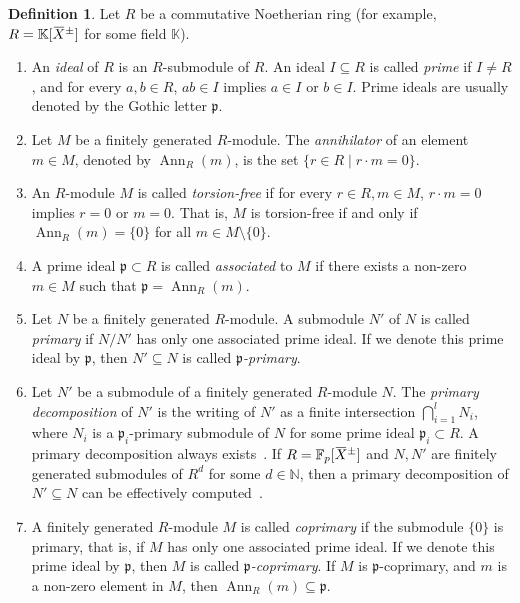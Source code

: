 \documentclass[a4paper,UKenglish,cleveref, autoref, thm-restate]{lipics-v2021}
\newcommand{\N}{\mathbb{N}}
\newcommand{\K}{\mathbb{K}}
\newcommand{\F}{\mathbb{F}}
\newcommand{\Ann}{\operatorname{Ann}}
\newcommand{\oX}{\mkern 1.5mu\overline{\mkern-1.5mu X \mkern-1.5mu}\mkern 1.5mu}
\newcommand{\frp}{\mathfrak{p}}
\theoremstyle{definition}
\newtheorem{defn}[thrm]{Definition}
\theoremstyle{definition}
\theoremstyle{definition}
\begin{document}
\begin{defn}\label{def:commalg}
    Let $R$ be a commutative Noetherian ring (for example, $R = \K[\oX^{\pm}]$ for some field $\K$).
    \begin{enumerate}[(1)]
        \item An \emph{ideal} of $R$ is an $R$-submodule of $R$. An ideal $I \subseteq R$ is called \emph{prime} if $I \neq R$, and for every $a, b \in R$, $ab \in I$ implies $a \in I$ or $b \in I$. Prime ideals are usually denoted by the Gothic letter $\frp$.
        \item Let $M$ be a finitely generated $R$-module. The \emph{annihilator} of an element $m \in M$, denoted by $\Ann_R(m)$, is the set $\{r \in R \mid r\cdot m = 0\}$.
        \item An $R$-module $M$ is called \emph{torsion-free} if for every $r \in R, m \in M$, $r \cdot m = 0$ implies $r = 0$ or $m = 0$. That is, $M$ is torsion-free if and only if $\Ann_R(m) = \{0\}$ for all $m \in M \setminus \{0\}$.
        \item A prime ideal $\frp \subset R$ is called \emph{associated} to $M$ if there exists a non-zero $m \in M$ such that $\frp = \Ann_R(m)$. \item Let $N$ be a finitely generated $R$-module. A submodule $N'$ of $N$ is called \emph{primary} if $N/N'$ has only one associated prime ideal. If we denote this prime ideal by $\frp$, then $N' \subseteq N$ is called \emph{$\frp$-primary}.
        \item Let $N'$ be a submodule of a finitely generated $R$-module $N$. The \emph{primary decomposition} of $N'$ is the writing of $N'$ as a finite intersection $\bigcap_{i = 1}^l N_i$, where $N_i$ is a $\frp_i$-primary submodule of $N$ for some prime ideal $\frp_i \subset R$.
        A primary decomposition always exists~\cite[Theorem~3.10]{eisenbud2013commutative}.
        If $R = \F_p[\oX^{\pm}]$ and $N, N'$ are finitely generated submodules of $R^d$ for some $d \in \N$, then a primary decomposition of $N' \subseteq N$ can be effectively computed~\cite{rutman1992grobner}.       
        \item A finitely generated $R$-module $M$ is called \emph{coprimary} if the submodule $\{0\}$ is primary, that is, if $M$ has only one associated prime ideal. If we denote this prime ideal by $\frp$, then $M$ is called \emph{$\frp$-coprimary}.
        If $M$ is $\frp$-coprimary, and $m$ is a non-zero element in $M$, then $\Ann_R(m) \subseteq \frp$.
    \end{enumerate}
\end{defn}
\end{document}
